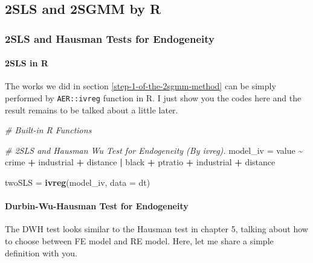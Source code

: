 \documentclass[
  12pt,
]{article}
\newenvironment{Shaded}{\begin{snugshade}}{\end{snugshade}}
\newcommand{\CommentTok}[1]{\textcolor[rgb]{0.56,0.35,0.01}{\textit{#1}}}
\newcommand{\DataTypeTok}[1]{\textcolor[rgb]{0.13,0.29,0.53}{#1}}
\newcommand{\KeywordTok}[1]{\textcolor[rgb]{0.13,0.29,0.53}{\textbf{#1}}}
\newcommand{\NormalTok}[1]{#1}
\newcommand{\OperatorTok}[1]{\textcolor[rgb]{0.81,0.36,0.00}{\textbf{#1}}}
\newcommand{\StringTok}[1]{\textcolor[rgb]{0.31,0.60,0.02}{#1}}
\begin{document}
\hypertarget{sls-and-2sgmm-by-r}{%
\subsection{2SLS and 2SGMM by R}\label{sls-and-2sgmm-by-r}}

\hypertarget{sls-and-hausman-tests-for-endogeneity}{%
\subsubsection{2SLS and Hausman Tests for Endogeneity}\label{sls-and-hausman-tests-for-endogeneity}}

\hypertarget{sls-in-r}{%
\paragraph{2SLS in R}\label{sls-in-r}}

The works we did in section \ref{step-1-of-the-2sgmm-method} can be simply performed by \texttt{AER::ivreg} function in R. I just show you the codes here and the result remains to be talked about a little later.

\begin{Shaded}
\begin{Highlighting}[]
\CommentTok{\# Built{-}in R Functions}

\CommentTok{\# 2SLS and Hausman Wu Test for Endogeneity (By ivreg).}
\NormalTok{model\_iv =}\StringTok{ }\NormalTok{value }\OperatorTok{\textasciitilde{}}\StringTok{ }\NormalTok{crime }\OperatorTok{+}\StringTok{ }\NormalTok{industrial }\OperatorTok{+}\StringTok{ }\NormalTok{distance }\OperatorTok{|}\StringTok{ }
\StringTok{    }\NormalTok{black }\OperatorTok{+}\StringTok{ }\NormalTok{ptratio }\OperatorTok{+}\StringTok{ }\NormalTok{industrial }\OperatorTok{+}\StringTok{ }\NormalTok{distance}

\NormalTok{twoSLS =}\StringTok{ }\KeywordTok{ivreg}\NormalTok{(model\_iv, }\DataTypeTok{data =}\NormalTok{ dt)}
\end{Highlighting}
\end{Shaded}

\hypertarget{durbin-wu-hausman-test-for-endogeneity}{%
\paragraph{Durbin-Wu-Hausman Test for Endogeneity}\label{durbin-wu-hausman-test-for-endogeneity}}

The DWH test looks similar to the Hausman test in chapter 5, talking about how to choose between FE model and RE model. Here, let me share a simple definition with you.
\end{document}
